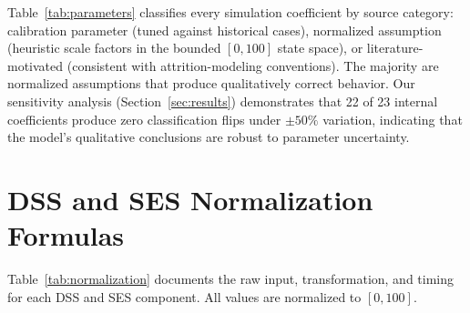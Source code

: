 Table~\ref{tab:parameters} classifies every simulation coefficient by source category: calibration parameter (tuned against historical cases), normalized assumption (heuristic scale factors in the bounded $[0, 100]$ state space), or literature-motivated (consistent with attrition-modeling conventions). The majority are normalized assumptions that produce qualitatively correct behavior. Our sensitivity analysis (Section~\ref{sec:results}) demonstrates that 22 of 23 internal coefficients produce zero classification flips under $\pm 50\%$ variation, indicating that the model's qualitative conclusions are robust to parameter uncertainty.

\section{DSS and SES Normalization Formulas}
\label{app:normalization}

Table~\ref{tab:normalization} documents the raw input, transformation, and timing for each DSS and SES component. All values are normalized to $[0, 100]$.

